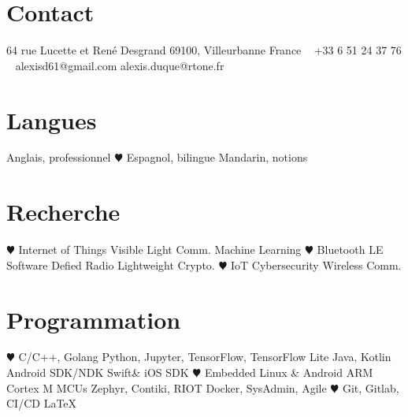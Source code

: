 \documentclass[]{cv-style}          %
\begin{document}
\lastupdated


\begin{aside}
%
\section{Contact}
64 rue Lucette et René Desgrand
69100, Villeurbanne
France
~
+33 6 51 24 37 76
~
alexisd61@gmail.com
alexis.duque@rtone.fr

%
\section{Langues}
Anglais, professionnel
{\color{red} $\varheartsuit$} Espagnol, bilingue
Mandarin, notions
%
\section{Recherche}
{\color{red} $\varheartsuit$} Internet of Things
Visible Light Comm.
Machine Learning
{\color{red} $\varheartsuit$} Bluetooth LE
Software Defied Radio
Lightweight Crypto.
{\color{red} $\varheartsuit$} IoT Cybersecurity
Wireless Comm.
%
\section{Programmation}
{\color{red} $\varheartsuit$} C/C++, Golang
Python, Jupyter, TensorFlow, TensorFlow Lite
Java, Kotlin
Android SDK/NDK
Swift\& iOS SDK
{\color{red} $\varheartsuit$} Embedded Linux \& Android
ARM Cortex M MCUs
Zephyr, Contiki, RIOT
Docker, SysAdmin, Agile
{\color{red} $\varheartsuit$} Git, Gitlab, CI/CD
\LaTeX{}
%
\end{aside}



 \vspace{0.15cm}
\end{document}
